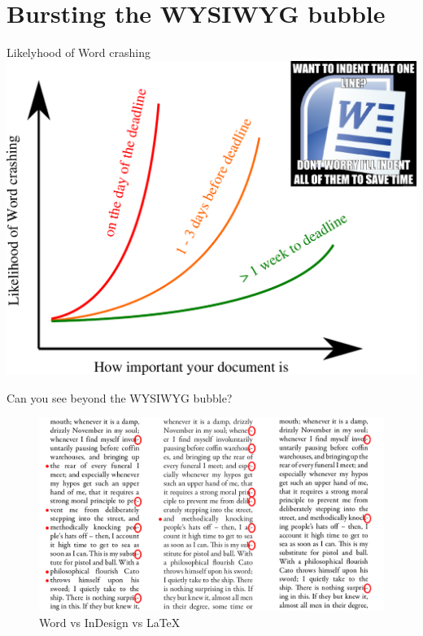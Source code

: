 \documentclass[10pt,times]{beamer}
\subtitle{\LaTeX, vector graphics, reference management and version control}
\begin{document}
\begin{frame}
  \titlepage
\end{frame}

\section{Bursting the WYSIWYG bubble}

\begin{frame}{Likelyhood of Word crashing}
  \centering
  \includegraphics[height=0.8\textheight]{figs/word_crash}
\end{frame}

\begin{frame}{Can you see beyond the WYSIWYG bubble?}
  \begin{figure}
    \centering
    \includegraphics[width=\linewidth]{figs/LaTeX_InDesign_Word.png}
    \caption*{Word vs InDesign vs LaTeX}
\end{figure}
\end{frame}
\end{document}
